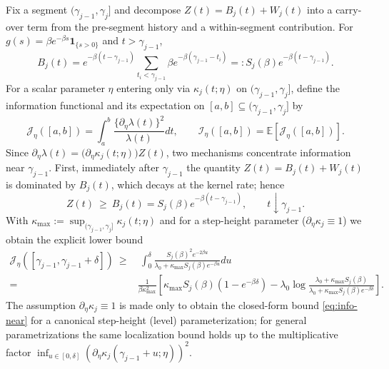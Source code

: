 \documentclass{article}
\theoremstyle{plain}
\theoremstyle{definition}
\newcommand{\E}{\mathbb{E}}
\newcommand{\1}{\mathbf{1}}
\begin{document}
    Fix a segment $(\gamma_{j-1},\gamma_j]$ and decompose $Z(t)=B_j(t)+W_j(t)$ into a carry-over term from the pre-segment history and a within-segment contribution. For $g(s)=\beta e^{-\beta s}\1_{\{s>0\}}$ and $t>\gamma_{j-1}$,
    \[
    B_j(t)=e^{-\beta(t-\gamma_{j-1})}\sum_{t_i<\gamma_{j-1}}\beta e^{-\beta(\gamma_{j-1}-t_i)}
    =:S_j(\beta) e^{-\beta(t-\gamma_{j-1})}.
    \]
    For a scalar parameter $\eta$ entering only via $\kappa_j(t;\eta)$ on $(\gamma_{j-1},\gamma_j]$, define the information functional and its expectation on $[a,b]\subseteq(\gamma_{j-1},\gamma_j]$ by
    \[
    \mathcal J_\eta([a,b])=\int_a^b \frac{\{\partial_\eta \lambda(t)\}^2}{\lambda(t)} dt,
    \qquad
    \mathcal I_\eta([a,b])=\E[\mathcal J_\eta([a,b])].
    \]
    Since $\partial_\eta\lambda(t)=\big(\partial_\eta\kappa_j(t;\eta)\big)Z(t)$, two mechanisms concentrate information near $\gamma_{j-1}$. First, immediately after $\gamma_{j-1}$ the quantity $Z(t)=B_j(t)+W_j(t)$ is dominated by $B_j(t)$, which decays at the kernel rate; hence
    \[
    Z(t)\ \ge\ B_j(t)=S_j(\beta) e^{-\beta (t-\gamma_{j-1})},\qquad t\downarrow \gamma_{j-1}.
    \]
    With $\kappa_{\max}:=\sup_{(\gamma_{j-1},\gamma_j]}\kappa_j(t;\eta)$ and for a step-height parameter ($\partial_\eta\kappa_j\equiv 1$) we obtain the explicit lower bound
    \begin{align}
    \label{eq:info-near}
    \mathcal J_\eta([\gamma_{j-1},\gamma_{j-1}+\delta])
    \ \ge&\
    \int_0^\delta 
    \frac{S_j(\beta)^2 e^{-2\beta u}}
    {\lambda_0+\kappa_{\max} S_j(\beta) e^{-\beta u}} du\\
    =&\frac{1}{\beta \kappa_{\max}^2} \left[
    \kappa_{\max} S_j(\beta)(1-e^{-\beta\delta})
    -\lambda_0\log \frac{\lambda_0+\kappa_{\max} S_j(\beta)}{\lambda_0+\kappa_{\max} S_j(\beta)e^{-\beta\delta}}
    \right] .
    \end{align}
    The assumption $\partial_\eta\kappa_j\equiv 1$ is made only to obtain the closed-form bound \eqref{eq:info-near} for a canonical step-height (level) parameterization; for general parametrizations the same localization bound holds up to the multiplicative factor $\inf_{u\in[0,\delta]}(\partial_\eta\kappa_j(\gamma_{j-1}+u;\eta))^2$.
\end{document}
